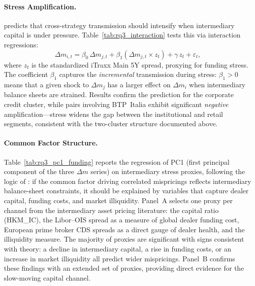 \paragraph{Stress Amplification.}
\citet{duffie2010presidential} predicts that cross-strategy transmission
should intensify when intermediary capital is under pressure.
Table~\ref{tab:rq3_interaction} tests this via interaction regressions:
\begin{equation}\label{eq:interaction}
  \Delta m_{i,t} = \beta_0\, \Delta m_{j,t}
  + \beta_1 (\Delta m_{j,t} \times z_t)
  + \gamma\, z_t + \varepsilon_t,
\end{equation}
where $z_t$ is the standardized iTraxx Main 5Y spread, proxying for
funding stress. The coefficient $\beta_1$ captures the \emph{incremental}
transmission during stress: $\beta_1 > 0$ means that a given shock to
$\Delta m_j$ has a larger effect on $\Delta m_i$ when intermediary
balance sheets are strained. Results confirm the prediction for the
corporate credit cluster, while pairs involving BTP~Italia exhibit
significant \emph{negative} amplification---stress widens the gap between
the institutional and retail segments, consistent with the two-cluster
structure documented above.



\paragraph{Common Factor Structure.}
Table~\ref{tab:rq3_pc1_funding} reports the regression of PC1 (first
principal component of the three $\Delta m$ series) on intermediary
stress proxies, following the logic of \citet{duffie2010presidential}:
if the common factor driving correlated mispricings reflects
intermediary balance-sheet constraints, it should be explained by
variables that capture dealer capital, funding costs, and market
illiquidity. Panel~A selects one proxy per channel from the
intermediary asset pricing literature:
the \citet{he2017intermediary} capital ratio (HKM\_IC),
the Libor--OIS spread as a measure of global dealer funding cost,
European prime broker CDS spreads as a direct gauge of dealer health,
and the \citet{amihud2015pricing} illiquidity measure.
The majority of proxies are significant with signs consistent with
theory: a decline in intermediary capital, a rise in funding costs,
or an increase in market illiquidity all predict wider mispricings.
Panel~B confirms these findings with an extended set of proxies,
providing direct evidence for the slow-moving capital channel.


